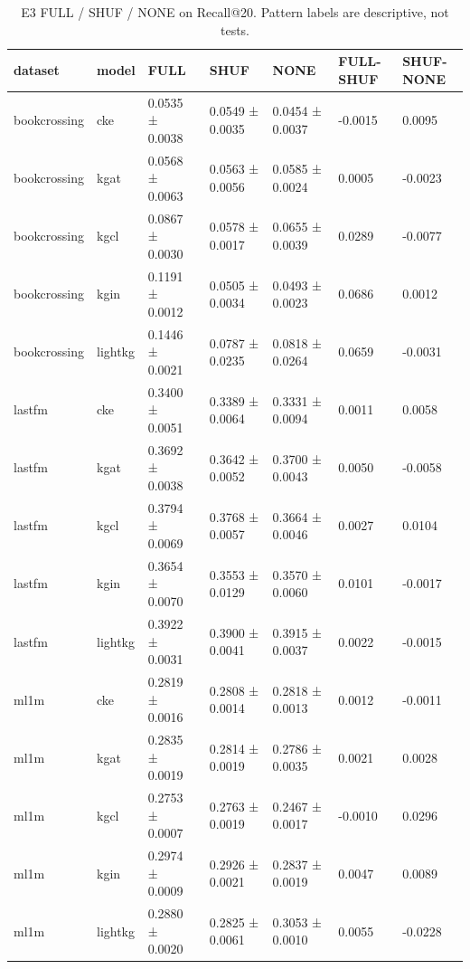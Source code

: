 \begin{table}[t]
\centering
\caption{E3 FULL / SHUF / NONE on Recall@20. Pattern labels are descriptive, not tests.}
\label{tab:e3}
\begin{tabular}{lllllll}
\hline
dataset & model & FULL & SHUF & NONE & FULL-SHUF & SHUF-NONE \\
\hline
bookcrossing & cke & 0.0535 ± 0.0038 & 0.0549 ± 0.0035 & 0.0454 ± 0.0037 & -0.0015 & 0.0095 \\
bookcrossing & kgat & 0.0568 ± 0.0063 & 0.0563 ± 0.0056 & 0.0585 ± 0.0024 & 0.0005 & -0.0023 \\
bookcrossing & kgcl & 0.0867 ± 0.0030 & 0.0578 ± 0.0017 & 0.0655 ± 0.0039 & 0.0289 & -0.0077 \\
bookcrossing & kgin & 0.1191 ± 0.0012 & 0.0505 ± 0.0034 & 0.0493 ± 0.0023 & 0.0686 & 0.0012 \\
bookcrossing & lightkg & 0.1446 ± 0.0021 & 0.0787 ± 0.0235 & 0.0818 ± 0.0264 & 0.0659 & -0.0031 \\
lastfm & cke & 0.3400 ± 0.0051 & 0.3389 ± 0.0064 & 0.3331 ± 0.0094 & 0.0011 & 0.0058 \\
lastfm & kgat & 0.3692 ± 0.0038 & 0.3642 ± 0.0052 & 0.3700 ± 0.0043 & 0.0050 & -0.0058 \\
lastfm & kgcl & 0.3794 ± 0.0069 & 0.3768 ± 0.0057 & 0.3664 ± 0.0046 & 0.0027 & 0.0104 \\
lastfm & kgin & 0.3654 ± 0.0070 & 0.3553 ± 0.0129 & 0.3570 ± 0.0060 & 0.0101 & -0.0017 \\
lastfm & lightkg & 0.3922 ± 0.0031 & 0.3900 ± 0.0041 & 0.3915 ± 0.0037 & 0.0022 & -0.0015 \\
ml1m & cke & 0.2819 ± 0.0016 & 0.2808 ± 0.0014 & 0.2818 ± 0.0013 & 0.0012 & -0.0011 \\
ml1m & kgat & 0.2835 ± 0.0019 & 0.2814 ± 0.0019 & 0.2786 ± 0.0035 & 0.0021 & 0.0028 \\
ml1m & kgcl & 0.2753 ± 0.0007 & 0.2763 ± 0.0019 & 0.2467 ± 0.0017 & -0.0010 & 0.0296 \\
ml1m & kgin & 0.2974 ± 0.0009 & 0.2926 ± 0.0021 & 0.2837 ± 0.0019 & 0.0047 & 0.0089 \\
ml1m & lightkg & 0.2880 ± 0.0020 & 0.2825 ± 0.0061 & 0.3053 ± 0.0010 & 0.0055 & -0.0228 \\
\hline
\end{tabular}
\end{table}
